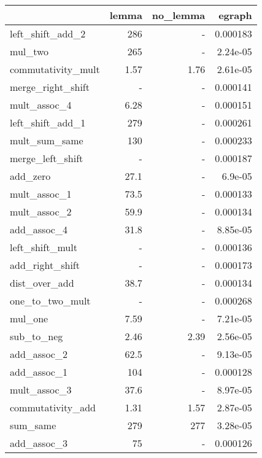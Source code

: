 \begin{tabular}{lrrr}
\toprule
 & lemma & no_lemma & egraph \\
\midrule
left_shift_add_2 & 286 & - & 0.000183 \\
mul_two & 265 & - & 2.24e-05 \\
commutativity_mult & 1.57 & 1.76 & 2.61e-05 \\
merge_right_shift & - & - & 0.000141 \\
mult_assoc_4 & 6.28 & - & 0.000151 \\
left_shift_add_1 & 279 & - & 0.000261 \\
mult_sum_same & 130 & - & 0.000233 \\
merge_left_shift & - & - & 0.000187 \\
add_zero & 27.1 & - & 6.9e-05 \\
mult_assoc_1 & 73.5 & - & 0.000133 \\
mult_assoc_2 & 59.9 & - & 0.000134 \\
add_assoc_4 & 31.8 & - & 8.85e-05 \\
left_shift_mult & - & - & 0.000136 \\
add_right_shift & - & - & 0.000173 \\
dist_over_add & 38.7 & - & 0.000134 \\
one_to_two_mult & - & - & 0.000268 \\
mul_one & 7.59 & - & 7.21e-05 \\
sub_to_neg & 2.46 & 2.39 & 2.56e-05 \\
add_assoc_2 & 62.5 & - & 9.13e-05 \\
add_assoc_1 & 104 & - & 0.000128 \\
mult_assoc_3 & 37.6 & - & 8.97e-05 \\
commutativity_add & 1.31 & 1.57 & 2.87e-05 \\
sum_same & 279 & 277 & 3.28e-05 \\
add_assoc_3 & 75 & - & 0.000126 \\
\bottomrule
\end{tabular}
